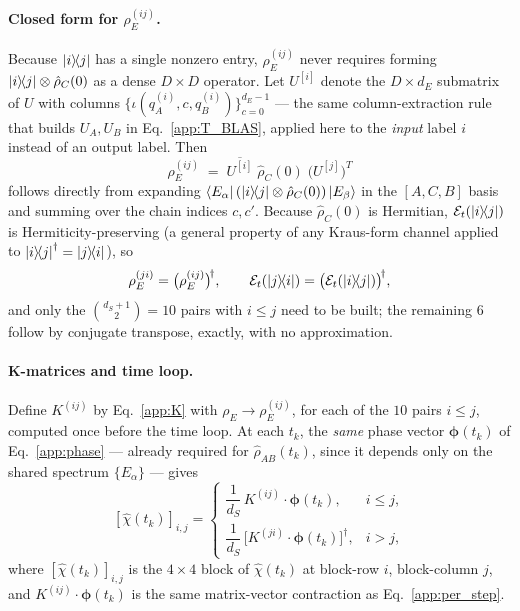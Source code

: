 \documentclass[12pt,a4paper]{article}
\newcommand{\rhohat}{\hat{\rho}}
\begin{document}
\paragraph{Closed form for $\rho_E^{(ij)}$.}
Because $\ketbra{i}{j}$ has a single nonzero entry, $\rho_E^{(ij)}$ never
requires forming $\ketbra{i}{j}\otimes\rhohat_C(0)$ as a dense $D\times D$
operator. Let $U^{[i]}$ denote the $D\times d_E$ submatrix of $U$ with
columns $\{\iota(q_A^{(i)},c,q_B^{(i)})\}_{c=0}^{d_E-1}$ — the same
column-extraction rule that builds $U_A,U_B$ in Eq.~\eqref{app:T_BLAS},
applied here to the \emph{input} label $i$ instead of an output label. Then
\begin{equation}
  \boxed{\;
    \rho_E^{(ij)} \;=\; \overline{U^{[i]}}\;\rhohat_C(0)\;\bigl(U^{[j]}\bigr)^T
  \;}
  \label{eq:rhoE_ij}
\end{equation}
follows directly from expanding $\bra{E_\alpha}(\ketbra{i}{j}\otimes\rhohat_C(0))\ket{E_\beta}$
in the $[A,C,B]$ basis and summing over the chain indices $c,c'$. Because
$\rhohat_C(0)$ is Hermitian, $\mathcal{E}_t(\ketbra{i}{j})$ is
Hermiticity-preserving (a general property of any Kraus-form channel
applied to $\ketbra{i}{j}^\dagger=\ketbra{j}{i}$), so
\begin{equation}
  \rho_E^{(ji)} = \bigl(\rho_E^{(ij)}\bigr)^{\!\dagger},
  \qquad
  \mathcal{E}_t(\ketbra{j}{i}) = \bigl(\mathcal{E}_t(\ketbra{i}{j})\bigr)^{\!\dagger},
  \label{eq:choi_herm}
\end{equation}
and only the $\binom{d_S+1}{2}=10$ pairs with $i\le j$ need to be built; the
remaining $6$ follow by conjugate transpose, exactly, with no approximation.

\paragraph{K-matrices and time loop.}
Define $K^{(ij)}$ by Eq.~\eqref{app:K} with $\rho_E\to\rho_E^{(ij)}$, for
each of the $10$ pairs $i\le j$, computed once before the time loop. At each
$t_k$, the \emph{same} phase vector $\boldsymbol\phi(t_k)$ of
Eq.~\eqref{app:phase} — already required for $\rhohat_{AB}(t_k)$, since it
depends only on the shared spectrum $\{E_\alpha\}$ — gives
\begin{equation}
  \boxed{\;
    [\hat\chi(t_k)]_{i,j} =
    \begin{cases}
      \dfrac{1}{d_S}\,K^{(ij)}\cdot\boldsymbol\phi(t_k), & i\le j,\\[8pt]
      \dfrac{1}{d_S}\,\bigl[K^{(ji)}\cdot\boldsymbol\phi(t_k)\bigr]^{\dagger}, & i>j,
    \end{cases}
  \;}
  \label{eq:choi_assembly}
\end{equation}
where $[\hat\chi(t_k)]_{i,j}$ is the $4\times4$ block of $\hat\chi(t_k)$ at
block-row $i$, block-column $j$, and $K^{(ij)}\cdot\boldsymbol\phi(t_k)$ is the
same matrix-vector contraction as Eq.~\eqref{app:per_step}.
\end{document}
